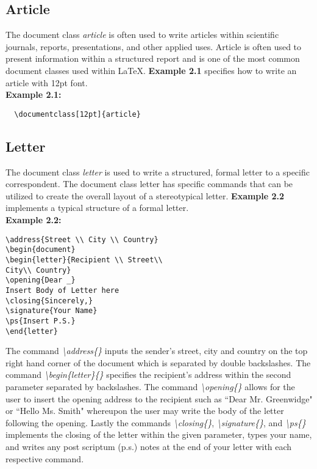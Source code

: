 \documentclass[11pt,twocolumn]{article}
\begin{document}
\subsection{Article}

The document class \textit{article} is often used to write articles within scientific journals, reports, presentations, and other applied uses. Article is often used to present information within a structured report and is one of the most common document classes used within \LaTeX. \textbf{Example 2.1} specifies how to write an article with 12pt font.\\
\newline
\noindent \textbf{Example 2.1:}
\begin{verbatim}
  \documentclass[12pt]{article}
\end{verbatim}

\subsection{Letter}

The document class \textit{letter} is used to write a structured, formal letter to a specific correspondent. The document class letter has specific commands that can be utilized to create the overall layout of a stereotypical letter. \textbf{Example 2.2} implements a typical structure of a formal letter.\\

\noindent \textbf{Example 2.2:}
\begin{verbatim}
\address{Street \\ City \\ Country}
\begin{document}
\begin{letter}{Recipient \\ Street\\
City\\ Country}
\opening{Dear _}
Insert Body of Letter here
\closing{Sincerely,}
\signature{Your Name}
\ps{Insert P.S.}
\end{letter}
\end{verbatim}
\par The command \textit{\textbackslash address\{\}} inputs the sender's street, city and country on the top right hand corner of the document which is separated by double backslashes. The command \textit{\textbackslash begin\{letter\}\{\}} specifies the recipient's address within the second parameter separated by backslashes. The command \textit{\textbackslash opening\{\}} allows for the user to insert the opening address to the recipient such as ``Dear Mr. Greenwidge" or ``Hello Ms. Smith" whereupon the user may write the body of the letter following the opening. Lastly the commands \textit{\textbackslash closing\{\}}, \textit{\textbackslash signature\{\}}, and \textit{\textbackslash ps\{\}} implements the closing of the letter within the given parameter, types your name, and writes any post scriptum (p.s.) notes at the end of your letter with each respective command.
\end{document}
